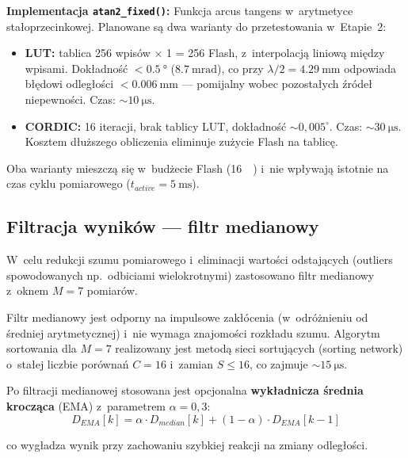\documentclass[a4paper,11pt]{article}
\begin{document}
\textbf{Implementacja \texttt{atan2\_fixed()}:} Funkcja arcus tangens
w~arytmetyce stałoprzecinkowej. Planowane są dwa warianty do przetestowania
w~Etapie~2:

\begin{itemize}[nosep]
    \item \textbf{LUT:} tablica 256 wpisów $\times$ \SI{1}{\byte}
          = \SI{256}{\byte} Flash, z~interpolacją liniową między wpisami.
          Dokładność $< \SI{0,5}{\degree}$ ($\SI{8,7}{\milli\radian}$),
          co przy $\lambda/2 = \SI{4,29}{\milli\metre}$ odpowiada błędowi
          odległości $< \SI{0,006}{\milli\metre}$ --- pomijalny wobec
          pozostałych źródeł niepewności. Czas: ${\sim}\SI{10}{\micro\second}$.
    \item \textbf{CORDIC:} 16 iteracji, brak tablicy LUT, dokładność
          ${\sim}0{,}005^{\circ}$. Czas: ${\sim}\SI{30}{\micro\second}$.
          Kosztem dłuższego obliczenia eliminuje zużycie Flash na tablicę.
\end{itemize}

Oba warianty mieszczą się w~budżecie Flash (\SI{16}{\kilo\byte}) i~nie wpływają
istotnie na czas cyklu pomiarowego ($t_{active} = \SI{5}{\milli\second}$).

\subsection{Filtracja wyników --- filtr medianowy}
\label{sec:filtr}

W~celu redukcji szumu pomiarowego i~eliminacji wartości odstających (outliers
spowodowanych np.\ odbiciami wielokrotnymi) zastosowano filtr medianowy
z~oknem $M = 7$ pomiarów.

Filtr medianowy jest odporny na impulsowe zakłócenia (w~odróżnieniu od średniej
arytmetycznej) i~nie wymaga znajomości rozkładu szumu. Algorytm sortowania
dla $M = 7$ realizowany jest metodą sieci sortujących (sorting network) o~stałej
liczbie porównań $C = 16$ i~zamian $S \leq 16$, co zajmuje ${\sim}\SI{15}{\micro\second}$.

Po filtracji medianowej stosowana jest opcjonalna \textbf{wykładnicza średnia
krocząca} (EMA) z~parametrem $\alpha = 0{,}3$:
\begin{equation}
    D_{EMA}[k] = \alpha \cdot D_{median}[k] + (1-\alpha) \cdot D_{EMA}[k-1]
    \label{eq:ema}
\end{equation}

co wygładza wynik przy zachowaniu szybkiej reakcji na zmiany odległości.
\end{document}
